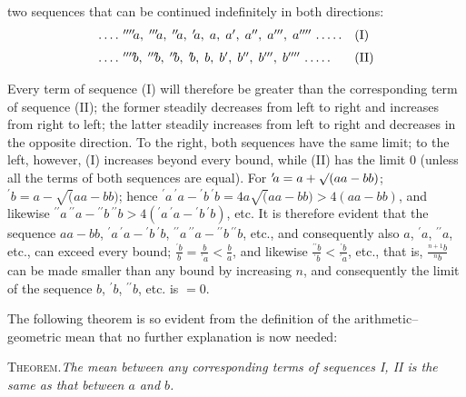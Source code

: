 two sequences that can be continued indefinitely in both directions:
\[
\begin{array}{@{}ll@{}}
.\,.\,.\,.\ {}^{\prime\prime\prime\prime}\!a,\;{}^{\prime\prime\prime}\!a,\;{}^{\prime\prime}\!a,\;{}^{\prime}\!a,\; a,\; a',\; a'',\; a''',\; a''''\ .\,.\,.\,.\,.&\mathrm{(I)}\\[6pt]
.\,.\,.\,.\ {}^{\prime\prime\prime\prime}\!b,\;{}^{\prime\prime\prime}\!b,\;{}^{\prime\prime}\!b,\;{}^{\prime}\!b,\; b,\; b',\; b'',\; b''',\; b''''\ .\,.\,.\,.\,.&\mathrm{(II)}
\end{array}
\]
\par Every term of sequence (I) will therefore be greater than the corresponding term of sequence (II); the former steadily decreases from left to right and increases
from right to left; the latter steadily increases from left to right and decreases in the opposite direction.
To the right, both sequences have the same limit; to the left, however, (I)
increases beyond every bound, while (II) has the limit $0$ (unless all the terms of both sequences are equal). For ${}^{\prime}\!a=\nobreak{}a+\nobreak{}\surd(aa-bb)$; ${}^{\prime}\!b=a-\surd(aa-bb)$;
hence ${}^{\prime}\!a\,{}^{\prime}\!a-{}^{\prime}\!b\,{}^{\prime}\!b=4a\surd(aa-bb)>4(aa-bb)$, and likewise ${}^{\prime\prime}\!a\,\allowbreak {}^{\prime\prime}\!a-{}^{\prime\prime}\!b\,\allowbreak {}^{\prime\prime}\!b>4({}^{\prime}\!a\,\allowbreak {}^{\prime}\!a-{}^{\prime}\!b\,\allowbreak {}^{\prime}\!b)$,
etc. It is therefore evident that the sequence $aa-bb$, ${}^{\prime}\!a\,{}^{\prime}\!a-{}^{\prime}\!b\,{}^{\prime}\!b$, ${}^{\prime\prime}\!a\,{}^{\prime\prime}\!a-{}^{\prime\prime}\!b\,{}^{\prime\prime}\!b$, etc., and consequently also
$a$, ${}^{\prime}\!a$, ${}^{\prime\prime}\!a$, etc., can exceed every bound; $\frac{{}^{\prime}\!b}{b}=\frac{b}{{}^{\prime}\!a}<\frac{b}{a}$, and likewise $\frac{{}^{\prime\prime}\!b}{{}^{\prime}\!b}<\frac{{}^{\prime}\!b}{{}^{\prime}\!a}$, etc.,
that is, $\frac{{}^{n+1}\!b}{{}^{n}\!b}$ can be made smaller than any bound by increasing $n$, and consequently the limit
of the sequence $b$, ${}^{\prime}\!b$, ${}^{\prime\prime}\!b$, etc. is $=0$.
\par 
The following theorem is so evident from the definition of the arithmetic–geometric mean
that no further explanation is now needed:

\textsc{Theorem.}\quad \textit{The mean between any corresponding terms of sequences I, II is the same as that between $a$ and $b$.}

\clearpage
\endgroup
